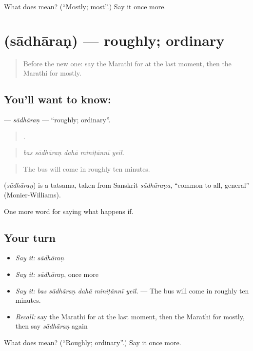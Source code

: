 \begin{tcolorbox}[breakable,colback=teal!4,colframe=teal!35!black,title={Before you move on}]
What does  mean? (\textquotedblleft{}Mostly; most\textquotedblright{}.) Say it once more.
\end{tcolorbox}
\section[\texorpdfstring{\mr{साधारण} (sādhāraṇ)}{साधारण (sādhāraṇ)}]{ (sādhāraṇ) — roughly; ordinary}

\label{lesson:MR-C554-sadharan}



\begin{quote}
Before the new one: say the Marathi for at the last moment, then the Marathi for mostly.
\end{quote}

\subsection*{You'll want to know: }
\textbf{} — \emph{sādhāraṇ} — \textquotedblleft{}roughly; ordinary\textquotedblright{}.

\begin{quote}
    .
\end{quote}

\begin{quote}
\emph{bas sādhāraṇ dahā miniṭānnī yeīl.}
\end{quote}

\begin{quote}
The bus will come in roughly ten minutes.
\end{quote}

\begin{cousinweb}
\textbf{} (\emph{sādhāraṇ}) is a tatsama, taken from Sanskrit \emph{sādhāraṇa}, \textquotedblleft{}common to all, general\textquotedblright{} (Monier-Williams).
\end{cousinweb}

\begin{grammarlens}[title={What you've built}]
One more word for saying what happens if.
\end{grammarlens}

\subsection*{Your turn}
\begin{itemize}
\raggedright
  \item \emph{Say it:} \emph{sādhāraṇ}
  \item \emph{Say it:} \emph{sādhāraṇ}, once more
  \item \emph{Say it:} \emph{bas sādhāraṇ dahā miniṭānnī yeīl.} — The bus will come in roughly ten minutes.
  \item \emph{Recall:} say the Marathi for at the last moment, then the Marathi for mostly, then say \emph{sādhāraṇ} again
\end{itemize}

\begin{tcolorbox}[breakable,colback=teal!4,colframe=teal!35!black,title={Before you move on}]
What does  mean? (\textquotedblleft{}Roughly; ordinary\textquotedblright{}.) Say it once more.
\end{tcolorbox}
